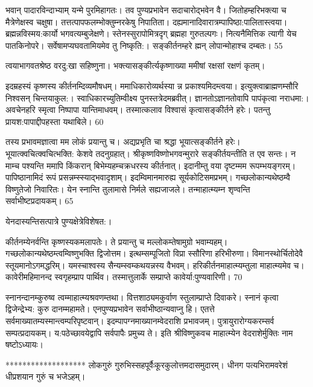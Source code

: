 भवान् पादारविन्दाभ्याम् यन्मे पुरमिहागतः।
तव पुण्यप्रभावेन सदाचारोद्भवेन वै।
जितोहम्हरिभक्त्या च मैत्रेणेक्षस्व चक्षुषा।
तत्तत्पापफलम्भोक्तुम्नरकेषु निपातिता।
दह्यमानादिवारात्रम्पापिष्ठा:पालितास्त्वया।
ब्रह्मन्नविस्मय:कार्यो भगवत्यम्बुजेक्षणे।
स्तेनस्सुरापोमित्रदृग् ब्रह्महा गुरुतल्पगः।
नित्यनैमित्तिक त्यागी येच पातकिनोपरे।
सर्वेषामप्यघवतामियमेव तु निष्कृति:।
सङ्कीर्तनम्हरे ह्मन् लोपान्मोहाश्च दम्बतः।
55

त्वयाभागवतश्रेष्ठ वरदु:खा सहिष्णुना।
भक्त्यासङ्कीर्त्यकृष्णाख्या ममीषां रक्षसां रक्षणं कृतम्।

इदम्रहस्यं कृष्णस्य कीर्तनम्दिव्यमौषधम्।
ममाधिकारोव्यर्थस्या न्न प्रकाश्यमिदम्त्वया।
इत्युक्त्वाब्राह्मणम्सौरि निश्वसन् चिन्तयाकुल:।
स्वाधिकारच्युतिम्वीक्ष्य पुनस्तत्रेदमब्रवीत्।
ज्ञानतोऽज्ञानतोवापि पापंकृत्वा नराधमा:।
अवचेनहरि स्मृत्वा निष्पापा यान्तिमाधवम्।
तस्मात्कलाव विश्वासं कृत्वासङ्कीर्तने हरेः।
पतन्तु प्रायश:पापाद्दीपहस्ता यथाबिले।
60

तस्य प्रभावमज्ञात्वा मम लोकं प्रयान्तु च।
अद्यप्रभृति चा श्रद्धा भूयात्सङ्कीर्तने हरेः।
भूयात्क्वचित्क्वचित्भक्ति: केशवे तदनुग्रहात्।
श्रीकृष्णविष्णोभगवन्मुरारे
सङ्कीर्तयन्तीति त एव सन्तः।
न माम्च पश्यन्ति ममापि
किंकरान् बिभेम्यहम्चक्रधरस्य कीर्तनात्।
इदानीम्तु वया दृष्टम्मम रूपम्भयङ्गरम्।
पापिष्ठानामिदं रूपं प्रसन्नम्स्स्याद्भवादृशाम्।
इदम्विमानमारुह्य सूर्यकोटिसमप्रभम्।
गच्छलोकान्यथेष्ठम्वै विष्णुतेजो निवारितः।
येन स्नान्ति तुलामासे निर्मले सह्यजाजले।
तन्माहात्म्यम्न शृण्वन्ति सर्वाभीष्टप्रदायकम्।
65

येनदास्यन्तिसत्पात्रे पुण्यक्षेत्रेविशेषत:।

कीर्तनम्येनर्वन्ति कृष्णस्यकमलापतेः।
ते प्रयान्तु च मल्लोकम्तेषामुग्रो भवाम्यहम्।
गच्छलोकान्यथेष्ठम्त्वम्विष्णुभक्ति द्विजोत्तम।
इत्थम्सम्पूजितो विप्रा स्सौरिणा हरिभीरुणा।
विमानस्थोर्चितोदेवै स्तूयमानोऽगमद्धरिम्।
यमस्चाश्वस्य सैन्यम्स्वम्कथयन्नस्य वैभवम्।
हरिकीर्तनमाहात्म्यम्तुला माहात्म्यमेव च।
कावेरीमहिमानन्द स्वगृहम्प्राप पार्थिव।
तस्मात्तुलार्के सम्प्राप्ते कावेर्या:पुण्यवारिणी।
70

स्नानन्दानम्कुरुष्व त्वम्माहात्म्यश्रवणम्तथा।
वित्तशाठ्यमकुर्वाण स्तुलाम्प्राप्ते दिवाकरे।
स्नानं कृत्वा द्विजेन्द्रेभ्य: कुरु दानम्महामते।
एनपुण्यप्रभावेन सर्वाभीष्ठान्यवाप्नु हि।
एतत्ते सर्वमाख्यातम्यस्मान्त्वम्परिपृष्टवान्।
इदम्पापग्नमाख्यानम्वेदराशि प्रभावजम्।
पुत्रायुरारोग्यकरम्सर्व सम्पत्प्रदायकम्।
य:पठेच्छावयेद्वापि सर्वपापैः प्रमुच्य ते।
इति श्रीविष्णुकवच माहात्म्येन वेदराशेर्मुक्तिः नाम
षष्टोऽध्यायः।

*******************
लोकगुरुं गुरुभिस्सहपूर्वैःकूरकुलोत्तमदासमुदारम्।
धीनग पत्यभिरामवरेशं धीप्रशयान गुरुं च भजेऽहम्।


